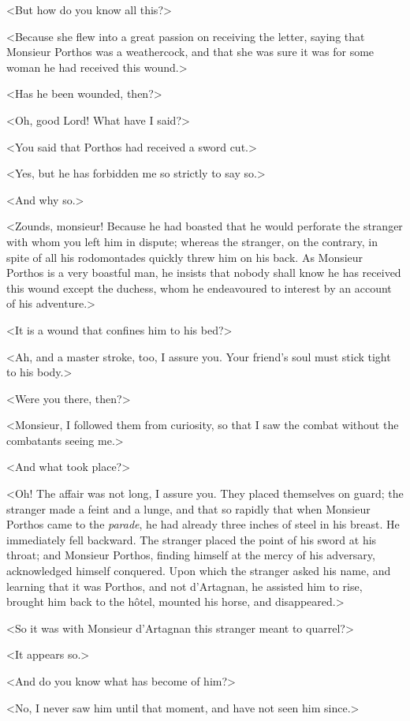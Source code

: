<But how do you know all this?> 

<Because she flew into a great passion on receiving the letter, saying that Monsieur Porthos was a weathercock, and that she was sure it was for some woman he had received this wound.> 

<Has he been wounded, then?> 

<Oh, good Lord! What have I said?> 

<You said that Porthos had received a sword cut.> 

<Yes, but he has forbidden me so strictly to say so.> 

<And why so.> 

<Zounds, monsieur! Because he had boasted that he would perforate the stranger with whom you left him in dispute; whereas the stranger, on the contrary, in spite of all his rodomontades quickly threw him on his back. As Monsieur Porthos is a very boastful man, he insists that nobody shall know he has received this wound except the duchess, whom he endeavoured to interest by an account of his adventure.> 

<It is a wound that confines him to his bed?> 

<Ah, and a master stroke, too, I assure you. Your friend's soul must stick tight to his body.> 

<Were you there, then?> 

<Monsieur, I followed them from curiosity, so that I saw the combat without the combatants seeing me.> 

<And what took place?> 

<Oh! The affair was not long, I assure you. They placed themselves on guard; the stranger made a feint and a lunge, and that so rapidly that when Monsieur Porthos came to the \textit{parade}, he had already three inches of steel in his breast. He immediately fell backward. The stranger placed the point of his sword at his throat; and Monsieur Porthos, finding himself at the mercy of his adversary, acknowledged himself conquered. Upon which the stranger asked his name, and learning that it was Porthos, and not d'Artagnan, he assisted him to rise, brought him back to the hôtel, mounted his horse, and disappeared.> 

<So it was with Monsieur d'Artagnan this stranger meant to quarrel?> 

<It appears so.> 

<And do you know what has become of him?> 

<No, I never saw him until that moment, and have not seen him since.> 

